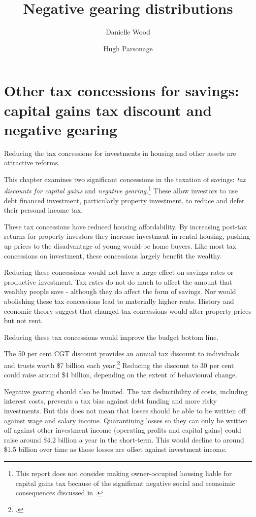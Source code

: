 \documentclass{grattan}\usepackage[]{graphicx}\usepackage[]{color}
\title{Negative gearing distributions}
\author{Danielle Wood \and Hugh Parsonage}
\newcommand{\highlight}[1]{\emph{#1}}
\begin{document}
\clearpage


\raggedbottom

\chapter{Other tax concessions for savings: capital gains tax discount and negative gearing}
Reducing the tax concessions for investments in housing and other assets are attractive reforms. 

This chapter examines two significant concessions in the taxation of savings: \highlight{tax discounts for capital gains} and \highlight{negative gearing}.\footnote{This report does not consider making owner-occupied housing liable for capital gains tax because of the significant negative social and econoimic consequences discussed in \textcite{Daley2013}.}  These allow investors to use debt financed investment, particularly property investment, to reduce and defer their personal income tax.

These tax concessions have reduced housing affordability. By increasing post-tax returns for property investors they increase investment in rental housing, pushing up prices to the disadvantage of young would-be home buyers. Like most tax concessions on investment, these concessions largely benefit the wealthy. 

Reducing these concessions would not have a large effect on savings rates or productive investment. Tax rates do not do much to affect the amount that wealthy people save - although they do affect the form of savings. Nor would abolishing these tax concessions lead to materially higher rents. History and economic theory suggest that changed tax concessions would alter property prices but not rent. 

Reducing these tax concessions would improve the budget bottom line. 

The 50 per cent CGT discount provides an annual tax discount to individuals and trusts worth \$7 billion each year.\footcite[p.~74]{Treasury2015a}  Reducing the discount to 30 per cent could raise around \$4 billion, depending on the extent of behavioural change. 

Negative gearing should also be limited. The tax deductibility of costs, including interest costs, prevents a tax bias against debt funding and more risky investments. But this does not mean that losses should be able to be written off against wage and salary income. Quarantining losses so they can only be written off against other investment income (operating profits and capital gains) could raise around \$4.2 billion a year in the short-term. This would decline to around \$1.5 billion over time as those losses are offset against investment income.  
\end{document}
